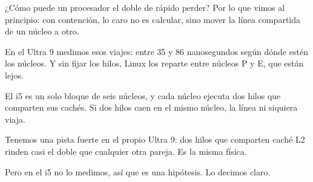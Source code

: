 ¿Cómo puede un procesador el doble de rápido perder? Por lo que vimos al principio: con contención, lo caro no es calcular, sino mover la línea compartida de un núcleo a otro.

En el Ultra 9 medimos esos viajes: entre 35 y 86 nanosegundos según dónde estén los núcleos. Y sin fijar los hilos, Linux los reparte entre núcleos P y E, que están lejos.

El i5 es un solo bloque de seis núcleos, y cada núcleo ejecuta dos hilos que comparten sus cachés. Si dos hilos caen en el mismo núcleo, la línea ni siquiera viaja.

Tenemos una pista fuerte en el propio Ultra 9: dos hilos que comparten caché L2 rinden casi el doble que cualquier otra pareja. Es la misma física.

Pero en el i5 no lo medimos, así que es una hipótesis. Lo decimos claro.
